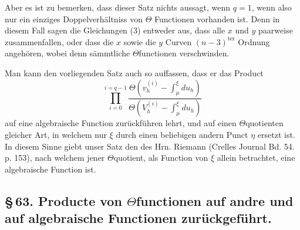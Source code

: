 \documentclass[10pt]{article}
\begin{document}
Aber es ist zu bemerken, dass dieser Satz nichts aussagt, wenn \(q=1\), wenn also nur ein einziges Doppelverhältniss von \(\Theta\) Functionen vorhanden ist. Denn in diesem Fall sagen die Gleichungen (3) entweder aus, dass alle \(x\) und \(y\) paarweise zusammenfallen, oder dass die \(x\) sowie die \(y\) Curven \((n-3)^{\mathrm{ter}}\) Ordnung angehören, wobei denn sämmtliche \(\Theta\)functionen verschwinden.

Man kann den vorliegenden Satz auch so auffassen, dass er das Product
\[
\prod_{i=0}^{i=q-1}
\frac{\Theta\left(v_h^{(i)}-\int_{\mu}^{\xi}du_h\right)}
     {\Theta\left(V_h^{(i)}-\int_{\mu}^{\xi}du_h\right)}
\]
auf eine algebraische Function zurückführen lehrt, und auf einen \(\Theta\)quotienten gleicher Art, in welchem nur \(\xi\) durch einen beliebigen andern Punct \(\eta\) ersetzt ist. In diesem Sinne giebt unser Satz den des Hrn. Riemann (Crelles Journal Bd. 54. p. 153), nach welchem jener \(\Theta\)quotient, als Function von \(\xi\) allein betrachtet, eine algebraische Function ist.

\subsection*{\S\,63. Producte von \(\Theta\)functionen auf andre und auf algebraische Functionen zurückgeführt.}
\end{document}
